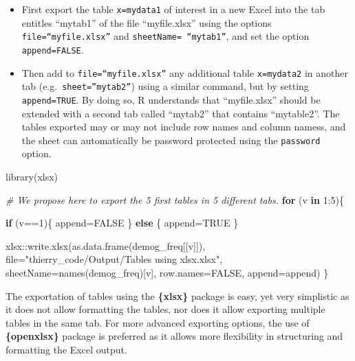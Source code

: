 \documentclass[
]{book}
\newenvironment{Shaded}{\begin{snugshade}}{\end{snugshade}}
\newcommand{\AttributeTok}[1]{\textcolor[rgb]{0.77,0.63,0.00}{#1}}
\newcommand{\CommentTok}[1]{\textcolor[rgb]{0.56,0.35,0.01}{\textit{#1}}}
\newcommand{\ConstantTok}[1]{\textcolor[rgb]{0.00,0.00,0.00}{#1}}
\newcommand{\ControlFlowTok}[1]{\textcolor[rgb]{0.13,0.29,0.53}{\textbf{#1}}}
\newcommand{\DecValTok}[1]{\textcolor[rgb]{0.00,0.00,0.81}{#1}}
\newcommand{\FunctionTok}[1]{\textcolor[rgb]{0.00,0.00,0.00}{#1}}
\newcommand{\NormalTok}[1]{#1}
\newcommand{\OtherTok}[1]{\textcolor[rgb]{0.56,0.35,0.01}{#1}}
\newcommand{\SpecialCharTok}[1]{\textcolor[rgb]{0.00,0.00,0.00}{#1}}
\newcommand{\StringTok}[1]{\textcolor[rgb]{0.31,0.60,0.02}{#1}}
\providecommand{\tightlist}{%
  \setlength{\itemsep}{0pt}\setlength{\parskip}{0pt}}
\begin{document}
\begin{itemize}
\tightlist
\item
  First export the table \texttt{x=mydata1} of interest in a new Excel into the tab entitles ``mytab1'' of the file ``myfile.xlsx'' using the options \texttt{file=“myfile.xlsx”} and \texttt{sheetName=\ “mytab1”}, and set the option \texttt{append=FALSE}.
\item
  Then add to \texttt{file=“myfile.xlsx”} any additional table \texttt{x=mydata2} in another tab (e.g.~\texttt{sheet=”mytab2”}) using a similar command, but by setting \texttt{append=TRUE}.
  By doing so, R understands that ``myfile.xlsx'' should be extended with a second tab called ``mytab2'' that contains ``mytable2''. The tables exported may or may not include row names and column namess, and the sheet can automatically be password protected using the \texttt{password} option.
\end{itemize}

\begin{Shaded}
\begin{Highlighting}[]
\FunctionTok{library}\NormalTok{(xlsx)}

\CommentTok{\# We propose here to export the 5 first tables in 5 different tabs.}
\ControlFlowTok{for}\NormalTok{ (v }\ControlFlowTok{in} \DecValTok{1}\SpecialCharTok{:}\DecValTok{5}\NormalTok{)\{}
  
  \ControlFlowTok{if}\NormalTok{ (v}\SpecialCharTok{==}\DecValTok{1}\NormalTok{)\{}
\NormalTok{    append}\OtherTok{=}\ConstantTok{FALSE}
\NormalTok{  \} }\ControlFlowTok{else}\NormalTok{ \{}
\NormalTok{    append}\OtherTok{=}\ConstantTok{TRUE}
\NormalTok{  \}}
  
\NormalTok{  xlsx}\SpecialCharTok{::}\FunctionTok{write.xlsx}\NormalTok{(}\FunctionTok{as.data.frame}\NormalTok{(demog\_freq[[v]]), }
                   \AttributeTok{file=}\StringTok{"thierry\_code/Output/Tables using xlsx.xlsx"}\NormalTok{, }
                   \AttributeTok{sheetName=}\FunctionTok{names}\NormalTok{(demog\_freq)[v], }
                   \AttributeTok{row.names=}\ConstantTok{FALSE}\NormalTok{, }\AttributeTok{append=}\NormalTok{append)}
\NormalTok{\}}
\end{Highlighting}
\end{Shaded}

The exportation of tables using the \textbf{\{xlsx\}} package is easy, yet very simplistic as it does not allow formatting the tables, nor does it allow exporting multiple tables in the same tab. For more advanced exporting options, the use of \textbf{\{openxlsx\}} package is preferred as it allows more flexibility in structuring and formatting the Excel output.
\end{document}
